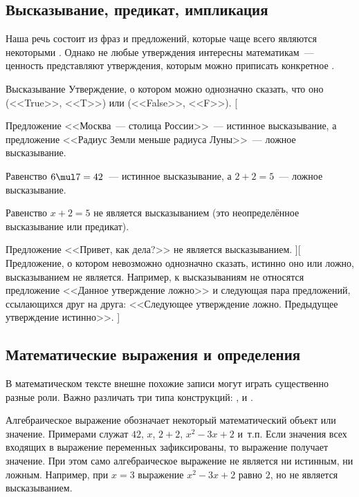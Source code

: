 \subsection{Высказывание, предикат, импликация}

Наша речь состоит из фраз и предложений, которые чаще всего являются некоторыми .
Однако не любые утверждения интересны математикам~--- ценность представляют утверждения, которым можно приписать конкретное .

{Высказывание}{
    Утверждение, о котором можно однозначно сказать, что оно  (<<True>>, <<T>>) или  (<<False>>, <<F>>).
}[
    \item Предложение <<Москва~--- столица России>>~--- истинное высказывание, а предложение <<Радиус Земли меньше радиуса Луны>>~--- ложное высказывание.
    \item Равенство $6 \mul 7 = 42$~--- истинное высказывание, а $2 + 2 = 5$~--- ложное высказывание.
    \item Равенство $x + 2 = 5$ не является высказыванием (это неопределённое высказывание или предикат).
    \item Предложение <<Привет, как дела?>> не является высказыванием.
][
    Предложение, о котором невозможно однозначно сказать, истинно оно или ложно, высказыванием не является.
    Например, к высказываниям не относятся предложение <<Данное утверждение ложно>> и следующая пара предложений, ссылающихся друг на друга: <<Следующее утверждение ложно. Предыдущее утверждение истинно>>.
]


\subsection{Математические выражения и определения}

В математическом тексте внешне похожие записи могут играть существенно разные роли.
Важно различать три типа конструкций:
,
 и
.

Алгебраическое выражение обозначает некоторый математический объект или значение.
Примерами служат $42$, $x$, $2 + 2$, $x^2 - 3x + 2$ и~т.п.
Если значения всех входящих в выражение переменных зафиксированы, то выражение получает значение.
При этом само алгебраическое выражение не является ни истинным, ни ложным.
Например, при $x = 3$ выражение $x^2 - 3x + 2$ равно $2$, но не является высказыванием.

